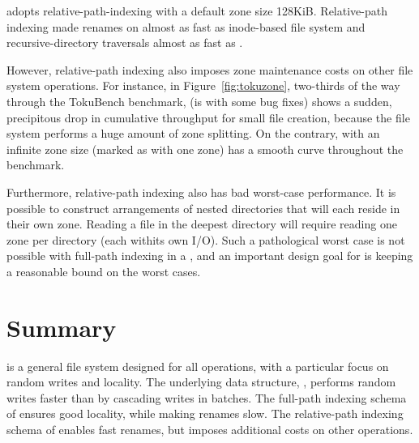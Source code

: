 \betrfsTwo adopts relative-path-indexing with a default zone size 128KiB.
Relative-path indexing made renames on \betrfsTwo almost as fast as inode-based
file system and recursive-directory traversals almost as fast as \betrfsOne.

However, relative-path indexing also imposes zone maintenance costs on other
file system operations.
For instance, in Figure~\ref{fig:tokuzone},
two-thirds of the way through the TokuBench benchmark,
\betrfsThree (\betrfsThree is \betrfsTwo with some bug fixes) shows a sudden,
precipitous drop in cumulative throughput for small file creation,
because the file system performs a huge amount of zone splitting.
On the contrary, \betrfsThree with an infinite zone size (marked as \betrfsThree
with one zone) has a smooth curve throughout the benchmark.

Furthermore, relative-path indexing also has bad worst-case performance.
It is possible to construct arrangements of nested directories that will each
reside in their own zone.
Reading a file in the deepest directory will require reading one zone per
directory (each withits own I/O).
Such a pathological worst case is not possible with full-path indexing in a
\bet, and an important design goal for \betrfs is keeping a reasonable bound on
the worst cases.

\section{Summary}

\betrfs is a general file system designed for all operations, with a particular
focus on random writes and locality.
The underlying data structure, \bets, performs random writes faster than \btrees
by cascading writes in batches.
The full-path indexing schema of \betrfsOne ensures good locality, while making
renames slow.
The relative-path indexing schema of \betrfsTwo enables fast renames,
but imposes additional costs on other operations.

